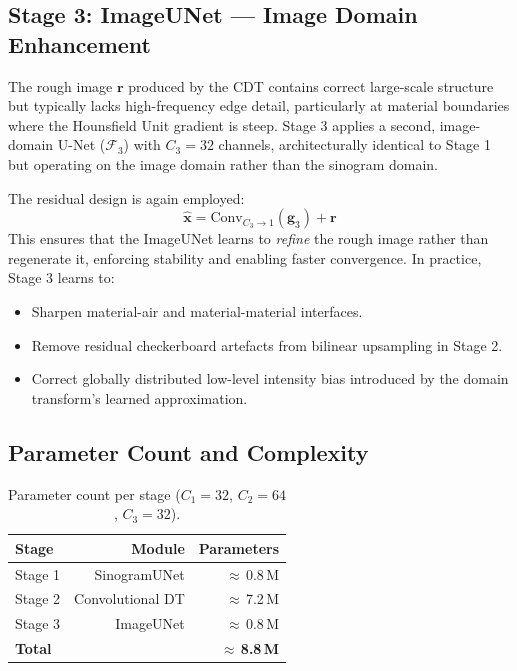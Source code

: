 \documentclass[10pt,twocolumn]{article}
\newcommand{\myvec}[1]{\bm{#1}}
\begin{document}
\subsection{Stage 3: ImageUNet --- Image Domain Enhancement}
\label{sec:stage3}

The rough image $\myvec{r}$ produced by the CDT contains correct
large-scale structure but typically lacks high-frequency edge detail,
particularly at material boundaries where the Hounsfield Unit
gradient is steep.
Stage 3 applies a second, image-domain U-Net ($\mathcal{F}_3$) with
$C_3 = 32$ channels, architecturally identical to Stage 1 but
operating on the image domain rather than the sinogram domain.

The residual design is again employed:
\begin{equation}
    \hat{\myvec{x}} = \mathrm{Conv}_{C_3 \to 1}(\myvec{g}_3) + \myvec{r}
\end{equation}
This ensures that the ImageUNet learns to \textit{refine} the rough
image rather than regenerate it, enforcing stability and enabling
faster convergence.
In practice, Stage 3 learns to:
\begin{itemize}[leftmargin=*,noitemsep]
    \item Sharpen material-air and material-material interfaces.
    \item Remove residual checkerboard artefacts from bilinear
    upsampling in Stage 2.
    \item Correct globally distributed low-level intensity bias
    introduced by the domain transform's learned approximation.
\end{itemize}

\subsection{Parameter Count and Complexity}

\begin{table}[H]
    \centering
    \caption{Parameter count per stage ($C_1{=}32$, $C_2{=}64$, $C_3{=}32$).}
    \label{tab:params}
    \begin{tabular}{lrr}
        \toprule
        \textbf{Stage} & \textbf{Module} & \textbf{Parameters} \\
        \midrule
        Stage 1 & SinogramUNet       & $\approx$\,0.8\,M \\
        Stage 2 & Convolutional DT   & $\approx$\,7.2\,M \\
        Stage 3 & ImageUNet          & $\approx$\,0.8\,M \\
        \midrule
        \textbf{Total} &            & $\approx$\,\textbf{8.8\,M} \\
        \bottomrule
    \end{tabular}
\end{table}
\end{document}
